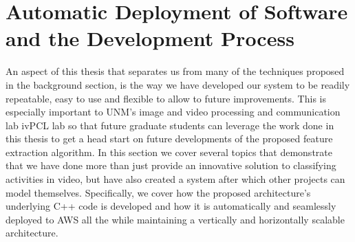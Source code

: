 \section{\label{section:auto_deployment}Automatic Deployment of Software and
the Development Process}
An aspect of this thesis that separates us from many of the techniques proposed
in the background section, is the way we have developed our system to be readily
repeatable, easy to use and flexible to allow to future improvements. This is
especially important to UNM's image and video processing and communication lab
ivPCL lab so that future graduate students can leverage the work done in this
thesis to get a head start on future developments of the proposed feature
extraction algorithm. In this section we cover several topics that demonstrate
that we have done more than just provide an innovative solution to classifying
activities in video, but have also created a system after which other projects
can model themselves. Specifically, we cover how the proposed architecture's
underlying C++ code is developed and how it is automatically and seamlessly
deployed to AWS all the while maintaining a vertically and horizontally scalable
architecture.

